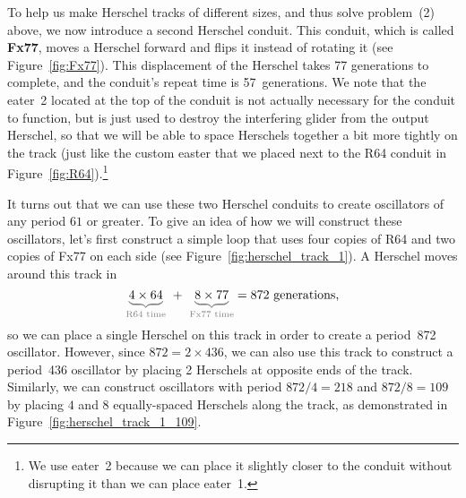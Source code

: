 To help us make Herschel tracks of different sizes, and thus solve problem~(2) above, we now introduce a second Herschel conduit. This conduit, which is called \textbf{Fx77}, moves a Herschel forward and flips it instead of rotating it (see Figure~\ref{fig:Fx77}). This displacement of the Herschel takes 77 generations to complete, and the conduit's repeat time is 57~generations. We note that the eater~2 located at the top of the conduit is not actually necessary for the conduit to function, but is just used to destroy the interfering glider from the output Herschel, so that we will be able to space Herschels together a bit more tightly on the track (just like the custom easter that we placed next to the R64 conduit in Figure~\ref{fig:R64}).\footnote{We use eater~2 because we can place it slightly closer to the conduit without disrupting it than we can place eater~1.}

It turns out that we can use these two Herschel conduits to create oscillators of any period $61$ or greater. To give an idea of how we will construct these oscillators, let's first construct a simple loop that uses four copies of R64 and two copies of Fx77 on each side (see Figure~\ref{fig:herschel_track_1}). A Herschel moves around this track in
\[
{\color{gray}\underbrace{\color{black}4 \times 64}_\text{R64 time}} \ + \ {\color{gray}\underbrace{\color{black}8\times 77}_\text{Fx77 time}} = 872 \text{ generations,}
\]
so we can place a single Herschel on this track in order to create a period~872 oscillator. However, since $872 = 2 \times 436$, we can also use this track to construct a period~436 oscillator by placing 2 Herschels at opposite ends of the track. Similarly, we can construct oscillators with period $872/4 = 218$ and $872/8 = 109$ by placing $4$ and $8$ equally-spaced Herschels along the track, as demonstrated in Figure~\ref{fig:herschel_track_1_109}.

